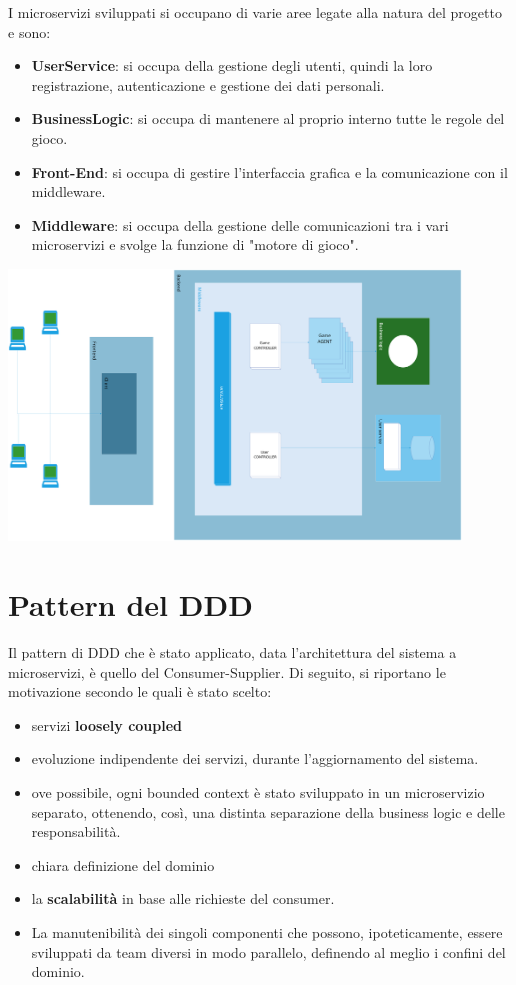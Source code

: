 I microservizi sviluppati si occupano di varie aree legate alla natura del progetto e sono:
\begin{itemize}
    \item \textbf{UserService}: si occupa della gestione degli utenti, quindi la loro registrazione, autenticazione e gestione dei dati personali.
    \item \textbf{BusinessLogic}: si occupa di mantenere al proprio interno tutte le regole del gioco.
    \item \textbf{Front-End}: si occupa di gestire l'interfaccia grafica e la comunicazione con il middleware.
    \item \textbf{Middleware}: si occupa della gestione delle comunicazioni tra i vari microservizi e svolge la funzione di "motore di gioco".
\end{itemize}

\includegraphics[width=12cm]{report/img/Architecture.png}\\[5.5cm]

\section{Pattern del DDD}

Il pattern di DDD che è stato applicato, data l'architettura del sistema a microservizi, è quello del Consumer-Supplier.
Di seguito, si riportano le motivazione secondo le quali è stato scelto:
\begin{itemize}
    \item servizi \textbf{loosely coupled}
    \item evoluzione indipendente dei servizi, durante l'aggiornamento del sistema.
    \item ove possibile, ogni bounded context è stato sviluppato in un microservizio separato, ottenendo, così, una distinta separazione della business logic e delle responsabilità. 
    \item chiara definizione del dominio
    \item la \textbf{scalabilità} in base alle richieste del consumer.
    \item La manutenibilità dei singoli componenti che possono, ipoteticamente, essere sviluppati da team diversi in modo parallelo, definendo al meglio i confini del dominio.

\end{itemize}
